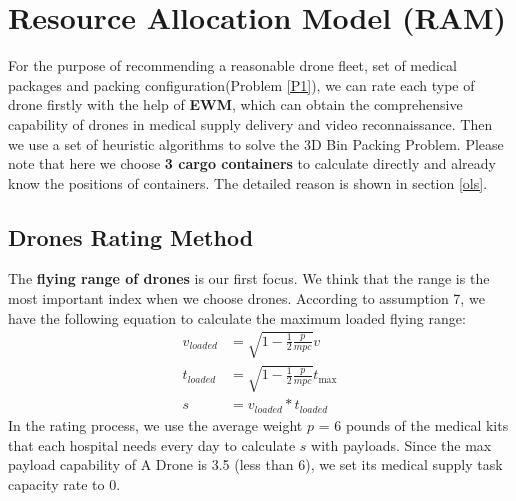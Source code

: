 \documentclass{mcmthesis}
\begin{document}
  \section{Resource Allocation Model (RAM)}
  For the purpose of recommending a reasonable drone fleet, set of medical packages and packing configuration(Problem \ref{P1}), we can rate each type of drone firstly with the help of \textbf{EWM}, which can obtain the comprehensive capability of drones in medical supply delivery and video reconnaissance. Then we use a set of heuristic algorithms to solve the 3D Bin Packing Problem. Please note that here we choose \textbf{3 cargo containers} to calculate directly and already know the positions of containers. The detailed reason is shown in section \ref{ols}.
  
  \subsection{Drones Rating Method}
  \label{ldis}
  The \textbf{flying range of drones} is our first focus. We think that the range is the most important index when we choose drones. According to assumption 7, we have the following equation to calculate the maximum loaded flying range:
  \begin{align}
  \label{8}
  {v_{loaded}} &= \sqrt {1 - \frac{1}{2}\frac{p}{{mpc}}} v\\
  {t_{loaded}} &= \sqrt {1 - \frac{1}{2}\frac{p}{{mpc}}} {t_{\max }}\\
  s &= {v_{loaded}}*{t_{loaded}}
    \label{dc}
  \end{align}
   In the rating process, we use the average weight $p$ = 6 pounds of the medical kits that each hospital needs every day to calculate $s$ with payloads. Since the max payload capability of A Drone is 3.5 (less than 6), we set its medical supply task capacity rate to 0.
   
\end{document}

